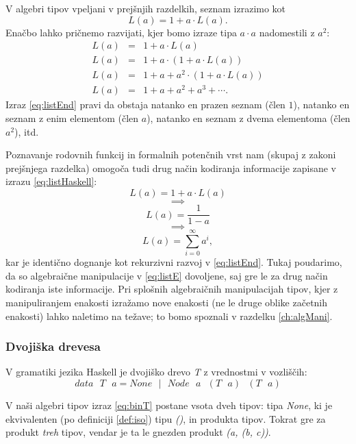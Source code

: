 \documentclass[a4paper, 12pt]{book}
\begin{document}
V algebri tipov vpeljani v prejšnjih razdelkih, seznam izrazimo kot
$$L(a)=1+a\cdot L(a).$$
Enačbo lahko pričnemo razvijati, kjer bomo izraze tipa $a\cdot a$ nadomestili z $a^2$:
\begin{eqnarray}
L(a)&=& 1+a\cdot L(a)\label{eq:list}\nonumber \\
L(a)&=& 1+a\cdot(1+a\cdot L(a))\nonumber\\
L(a)&=& 1+a+a^2\cdot(1+a\cdot L(a))\nonumber\\
L(a)&=& 1+a+a^2+a^3+\cdots. \label{eq:listEnd}
\end{eqnarray}
Izraz \eqref{eq:listEnd} pravi da obstaja natanko en prazen seznam (člen $1$), natanko en seznam z enim elementom (člen $a$), natanko en seznam z dvema elementoma (člen $a^2$), itd.

Poznavanje rodovnih funkcij in formalnih potenčnih vrst nam (skupaj z zakoni prejšnjega razdelka) omogoča tudi drug način kodiranja informacije zapisane v izrazu \eqref{eq:listHaskell}:
$$L(a)=1+a\cdot L(a)$$
$$\implies$$
\begin{equation}
L(a)=\frac{1}{1-a}\label{eq:listE}
\end{equation}
$$\implies$$
$$L(a)=\sum\limits_{i=0}^\infty a^i,$$
kar je identično dognanje kot rekurzivni razvoj v \eqref{eq:listEnd}. Tukaj poudarimo, da so algebraične manipulacije v \eqref{eq:listE} dovoljene, saj gre le za drug način kodiranja iste informacije. Pri splošnih algebraičnih manipulacijah tipov, kjer z manipuliranjem enakosti izražamo nove enakosti (ne le druge oblike začetnih enakosti) lahko naletimo na težave; to bomo spoznali v razdelku \ref{ch:algMani}.

\subsubsection{Dvojiška drevesa}

V gramatiki jezika Haskell je dvojiško drevo \emph{T} z vrednostmi v vozliščih:
\begin{equation}\label{eq:binT}
data\text{ }T\text{ } a = None \text{ }|\text{ } Node\text{ } a\text{ } (T\text{ } a)\text{ }(T\text{ }a)
\end{equation}

\noindent V naši algebri tipov izraz \eqref{eq:binT} postane vsota dveh tipov: tipa \emph{None}, ki je ekvivalenten (po definiciji \ref{def:iso}) tipu \emph{()}, in produkta tipov. Tokrat gre za produkt \emph{treh} tipov, vendar je ta le gnezden produkt \emph{(a, (b, c))}.
\end{document}
